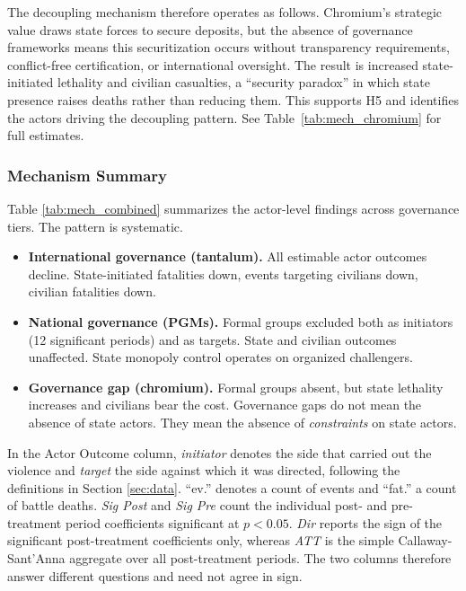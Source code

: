 \documentclass[11pt]{article}
\begin{document}
The decoupling mechanism therefore operates as follows. Chromium's strategic value draws state forces to secure deposits, but the absence of governance frameworks means this securitization occurs without transparency requirements, conflict-free certification, or international oversight. The result is increased state-initiated lethality and civilian casualties, a ``security paradox'' in which state presence raises deaths rather than reducing them. This supports H5 and identifies the actors driving the decoupling pattern. See Table~\ref{tab:mech_chromium} for full estimates.

\subsubsection{Mechanism Summary}

Table \ref{tab:mech_combined} summarizes the actor-level findings across governance tiers. The pattern is systematic.

\begin{itemize}
    \item \textbf{International governance (tantalum).} All estimable actor outcomes decline. State-initiated fatalities down, events targeting civilians down, civilian fatalities down.
    \item \textbf{National governance (PGMs).} Formal groups excluded both as initiators (12 significant periods) and as targets. State and civilian outcomes unaffected. State monopoly control operates on organized challengers.
    \item \textbf{Governance gap (chromium).} Formal groups absent, but state lethality increases and civilians bear the cost. Governance gaps do not mean the absence of state actors. They mean the absence of \textit{constraints} on state actors.
\end{itemize}



\noindent\footnotesize In the Actor Outcome column, \textit{initiator} denotes the side that carried out the violence and \textit{target} the side against which it was directed, following the definitions in Section \ref{sec:data}. ``ev.'' denotes a count of events and ``fat.'' a count of battle deaths. \textit{Sig Post} and \textit{Sig Pre} count the individual post- and pre-treatment period coefficients significant at $p<0.05$. \textit{Dir} reports the sign of the significant post-treatment coefficients only, whereas \textit{ATT} is the simple Callaway-Sant'Anna aggregate over all post-treatment periods. The two columns therefore answer different questions and need not agree in sign. \normalsize
\end{document}
